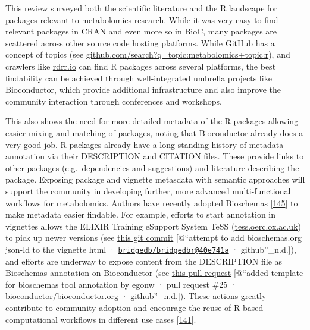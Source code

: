 \documentclass[]{article}
\begin{document}
This review surveyed both the scientific literature and the R landscape for packages relevant to metabolomics research. While it was very easy to find relevant packages in CRAN and even more so in BioC, many packages are scattered across other source code hosting platforms. While GitHub has a concept of topics (see \href{https://github.com/search?q=topic:metabolomics+topic:r}{github.com/search?q=topic:metabolomics+topic:r}), and crawlers like \href{https://rdrr.io/}{rdrr.io} can find R packages across several platforms, the best findability can be achieved through well-integrated umbrella projects like Bioconductor, which provide additional infrastructure and also improve the community interaction through conferences and workshops.

This also shows the need for more detailed metadata of the R packages allowing easier mixing and matching of packages, noting that Bioconductor already does a very good job. R packages already have a long standing history of metadata annotation via their DESCRIPTION and CITATION files. These provide links to other packages (e.g.~dependencies and suggestions) and literature describing the package. Exposing package and vignette metasdata with semantic approaches will support the community in developing further, more advanced multi-functional workflows for metabolomics. Authors have recently adopted Bioschemas {[}\protect\hyperlink{ref-gray_2017}{145}{]} to make metadata easier findable. For example, efforts to start annotation in vignettes allows the ELIXIR Training eSupport System TeSS (\href{https://tess.oerc.ox.ac.uk}{tess.oerc.ox.ac.uk}) to pick up newer versions (see \href{https://github.com/bridgedb/BridgeDbR/commit/40e741aed77765572e77f84f9fea0e0fb511d3f0}{this git commit} {[}@``attempt to add bioschemas.org json-ld to the vignette html · \href{mailto:bridgedb/bridgedbr@40e741a}{\nolinkurl{bridgedb/bridgedbr@40e741a}} · github''\_n.d.{]}), and efforts are underway to expose content from the DESCRIPTION file as Bioschemas annotation on Bioconductor (see \href{https://github.com/Bioconductor/bioconductor.org/pull/25}{this pull request} {[}@``added template for bioschemas tool annotation by egonw · pull request \#25 · bioconductor/bioconductor.org · github''\_n.d.{]}). These actions greatly contribute to community adoption and encourage the reuse of R-based computational workflows in different use cases {[}\protect\hyperlink{ref-goble_2019}{141}{]}.
\end{document}
